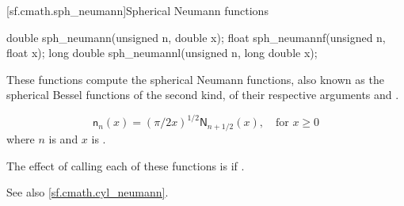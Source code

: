 [sf.cmath.sph_neumann]{Spherical Neumann functions}%
%
%
%
%
%
%
\begin{itemdecl}
double       sph_neumann(unsigned n, double x);
float        sph_neumannf(unsigned n, float x);
long double  sph_neumannl(unsigned n, long double x);
\end{itemdecl}

\begin{itemdescr}

\pnum\effects
These functions compute the spherical Neumann functions,
also known as the spherical Bessel functions of the second kind,
of their respective arguments
 and .

\pnum\returns
\[%
  \mathsf{n}_n(x) =
  (\pi/2x)^{1\!/\!2} \mathsf{N}_{n + 1\!/\!2}(x),
	   \quad \mbox{for $x \ge 0$}
\]
where
$n$ is  and
$x$ is .

\pnum\remarks
The effect of calling each of these functions
is 
if .

\pnum See also \ref{sf.cmath.cyl_neumann}.
\end{itemdescr}

